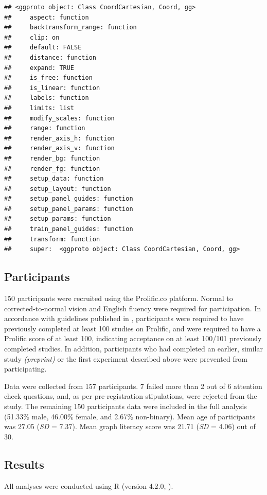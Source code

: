 \documentclass[preprint, 3p,
authoryear]{elsarticle} %
\begin{document}
\begin{verbatim}
## <ggproto object: Class CoordCartesian, Coord, gg>
##     aspect: function
##     backtransform_range: function
##     clip: on
##     default: FALSE
##     distance: function
##     expand: TRUE
##     is_free: function
##     is_linear: function
##     labels: function
##     limits: list
##     modify_scales: function
##     range: function
##     render_axis_h: function
##     render_axis_v: function
##     render_bg: function
##     render_fg: function
##     setup_data: function
##     setup_layout: function
##     setup_panel_guides: function
##     setup_panel_params: function
##     setup_params: function
##     train_panel_guides: function
##     transform: function
##     super:  <ggproto object: Class CoordCartesian, Coord, gg>
\end{verbatim}

\hypertarget{participants-1}{%
\subsection{Participants}\label{participants-1}}

150 participants were recruited using the Prolific.co platform. Normal
to corrected-to-normal vision and English fluency were required for
participation. In accordance with guidelines published in
\citep{peer_2021}, participants were required to have previously
completed at least 100 studies on Prolific, and were required to have a
Prolific score of at least 100, indicating acceptance on at least
100/101 previously completed studies. In addition, participants who had
completed an earlier, similar study \emph{(preprint)} or the first
experiment described above were prevented from participating.

Data were collected from 157 participants. 7 failed more than 2 out of 6
attention check questions, and, as per pre-registration stipulations,
were rejected from the study. The remaining 150 participants data were
included in the full analysis (51.33\% male, 46.00\% female, and 2.67\%
non-binary). Mean age of participants was 27.05 (\emph{SD} = 7.37). Mean
graph literacy score was 21.71 (\emph{SD} = 4.06) out of 30.

\hypertarget{results-1}{%
\subsection{Results}\label{results-1}}

All analyses were conducted using R (version 4.2.0, \citep{r_core}).
\end{document}
